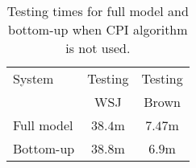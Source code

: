 \begin{table}[ht]

    \centering
    \begin{tabular}{|p{2.5cm}|c|c|}\hline
        System                           & Testing   & Testing \\
                                         & WSJ       & Brown   \\\hline 
        Full model                       & $38.4$m   & $7.47$m  \\
        Bottom-up                        & $38.8$m   & $6.9$m  \\
    \end{tabular}
    \caption{Testing times for full model and bottom-up when CPI algorithm is
    not used.}
    \label{tbl:nocpi}
\end{table}


